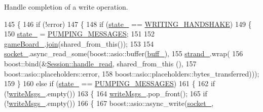 Handle completion of a write operation. 


\begin{DoxyCode}
145             \{
146                 \textcolor{keywordflow}{if} (!error)
147                 \{
148                     \textcolor{keywordflow}{if} (\hyperlink{classwebsocket_1_1Session_a8f9e0d65f4de675dd7b8242e17ee29b7}{state\_} == \hyperlink{classwebsocket_1_1Session_a643e11bb9d05b580f20ff232f3582c1ba272f56d02b3f719d25d23ebe3f68f44a}{WRITING\_HANDSHAKE})
149                     \{
150                         \hyperlink{classwebsocket_1_1Session_a8f9e0d65f4de675dd7b8242e17ee29b7}{state\_} = \hyperlink{classwebsocket_1_1Session_a643e11bb9d05b580f20ff232f3582c1baba12c4de6ae83a4f63b1c700d4ecfe8e}{PUMPING\_MESSAGES};
151 
152                         \hyperlink{classwebsocket_1_1Session_add75c0a25f69839df5441997846b3f3e}{gameBoard\_}.\hyperlink{classwebsocket_1_1GameBoard_a3ca61a3da72869402a6e1702a99faa76}{join}(shared\_from\_this());
153 
154                         \hyperlink{classwebsocket_1_1Session_a7e7771fef3f105f4019ef9a1c2f04eb5}{socket\_}.async\_read\_some(boost::asio::buffer(\hyperlink{classwebsocket_1_1Session_a4a7ca92db9c843899fbf3673fe5b9f52}{buff\_}),
155                                     \hyperlink{classwebsocket_1_1Session_a394bb9b578c166e22b2a630b8ea013fb}{strand\_}.wrap(
156                                     boost::bind(&\hyperlink{classwebsocket_1_1Session_ad23257dd2bffa48e90ed9941d39ca56b}{Session::handle\_read}, shared\_from\_this
      (),
157                                     boost::asio::placeholders::error,
158                                     boost::asio::placeholders::bytes\_transferred)));
159                     \}
160                     \textcolor{keywordflow}{else} \textcolor{keywordflow}{if} (\hyperlink{classwebsocket_1_1Session_a8f9e0d65f4de675dd7b8242e17ee29b7}{state\_} == \hyperlink{classwebsocket_1_1Session_a643e11bb9d05b580f20ff232f3582c1baba12c4de6ae83a4f63b1c700d4ecfe8e}{PUMPING\_MESSAGES})
161                     \{
162                         \textcolor{keywordflow}{if} (!\hyperlink{classwebsocket_1_1Session_ace231022157030f4d56de9bfeff43ac7}{writeMsgs\_}.empty())
163                         \{
164                             \hyperlink{classwebsocket_1_1Session_ace231022157030f4d56de9bfeff43ac7}{writeMsgs\_}.pop\_front();
165                             \textcolor{keywordflow}{if} (!\hyperlink{classwebsocket_1_1Session_ace231022157030f4d56de9bfeff43ac7}{writeMsgs\_}.empty())
166                             \{
167                                 boost::asio::async\_write(\hyperlink{classwebsocket_1_1Session_a7e7771fef3f105f4019ef9a1c2f04eb5}{socket\_},

\end{DoxyCode}
